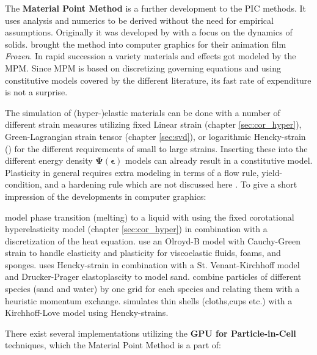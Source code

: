 \documentclass[m,times]{cgMA}
\begin{document}
The \textbf{Material Point Method} is a further development to the PIC methods. It uses analysis and numerics to be derived without the need for empirical assumptions. Originally it was developed by \cite{sulsky1995application} with a focus on the dynamics of solids. \cite{MPM:SNOW} brought the method into computer graphics for their animation film \textit{Frozen}. In rapid succession a variety materials and effects got modeled by the MPM. Since MPM is based on discretizing governing equations and using constitutive models covered by the different literature, its fast rate of expenditure is not a surprise.

The simulation of (hyper-)elastic materials can be done with a number of different strain measures utilizing fixed Linear strain (chapter \ref{sec:cor_hyper}), Green-Lagrangian strain tensor (chapter \ref{sec:svd}), or logarithmic Hencky-strain (\cite{MPM:SHELLS}) for the different requirements of small to large strains. Inserting these into the different energy density $\boldsymbol{\Psi}(\boldsymbol{\epsilon})$ models can already result in a constitutive model. Plasticity in general requires extra modeling in terms of a flow rule, yield-condition, and a hardening rule which are not discussed here \cite{ochsner2014elasto}. To give a short impression of the developments in computer graphics:

\cite{MPM:PHASE_CHANGE} model phase transition (melting) to a liquid with using the fixed corotational hyperelasticity model (chapter \ref{sec:cor_hyper}) in combination with a discretization of the heat equation. \cite{MPM:OLROYDB} use an Olroyd-B model with Cauchy-Green strain to handle elasticity and plasticity for viscoelastic fluids, foams, and sponges. \cite{MPM:DRUCKER} uses Hencky-strain in combination with a St. Venant-Kirchhoff model and Drucker-Prager elastoplascity to model sand.
\cite{MPM:MULTI} combine particles of different species (sand and water) by one grid for each species and relating them with a heuristic momentum exchange. \cite{MPM:SHELLS} simulates thin shells (cloths,cups etc.) with a Kirchhoff-Love model using Hencky-strains.

There exist several implementations utilizing the \textbf{GPU for Particle-in-Cell} techniques, which the Material Point Method is a part of:
\end{document}
